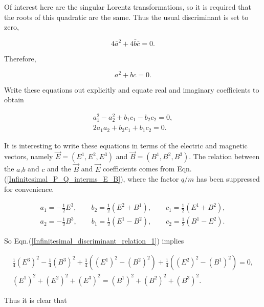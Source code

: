 \noindent Of interest here are the singular Lorentz transformations, so it is required that the roots of this quadratic are the same. Thus the usual discriminant is set to zero,

\begin{equation*} 
4 {\bar{a}}^2 + 4 \bar{b} \bar{c} = 0.
\end{equation*} 

\noindent Therefore,

\begin{equation}\label{Infinitesimal_Fractional_Cond_on_abc}
a^2 + bc = 0.
\end{equation}

\noindent Write these equations out explicitly and equate real and imaginary coefficients to obtain

\begin{gather}\label{Infinitesimal_discriminant_relation_1}
a_1^2 - a_2^2 + b_1 c_1 - b_2 c_2 = 0, \\\label{Infinitesimal_discriminant_relation_2}
2a_1 a_2 + b_2 c_1 + b_1 c_2 = 0.
\end{gather}

It is interesting to write these equations in terms of the electric and magnetic vectors, namely $\vec{E} = (E^1, E^2, E^3)$ and $\vec{B} = (B^1,B^2,B^3)$. The relation between the $a$,$b$ and $c$ and the $\vec{B}$ and $\vec{E}$ coefficients comes from Eqn.(\ref{Infinitesimal_P_Q_interms_E_B}), where the factor $q/m$ has been suppressed for convenience. 

\begin{eqnarray}\label{Infinitesimal_abc_interms_EB_1}
a_1 = -\frac{1}{2} E^3, \qquad b_2 = \frac{1}{2}(E^2 + B^1), \qquad c_1 = \frac{1}{2} (E^1 + B^2), \\\label{Infinitesimal_abc_interms_EB_2}
a_2 = -\frac{1}{2} B^3, \qquad b_1 = \frac{1}{2} (E^1 - B^2), \qquad c_2  = \frac{1}{2} (B^1 - E^2). 
\end{eqnarray}

\noindent So Eqn.(\ref{Infinitesimal_discriminant_relation_1}) implies

\begin{gather*}
\frac{1}{4} {(E^3)}^2 - \frac{1}{4} {(B^3)}^2 + \frac{1}{4} ({(E^1)}^2 - {(B^2)}^2) + \frac{1}{4} ({(E^2)}^2 - {(B^1)}^2) = 0,\\
{(E^1)}^2 + {(E^2)}^2 + {(E^3)}^2 = {(B^1)}^2 + {(B^2)}^2 + {(B^3)}^2.
\end{gather*}

\noindent Thus it is clear that

